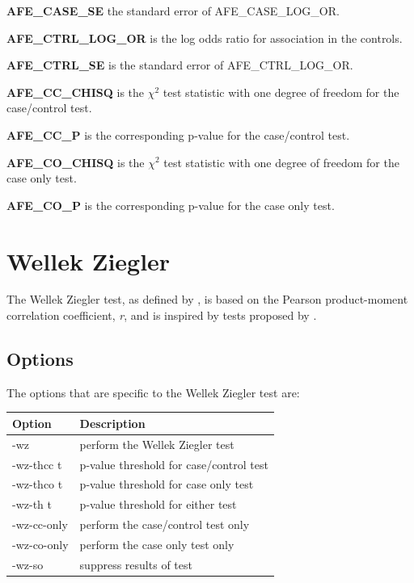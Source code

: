 \documentclass[a4paper,12pt]{article}
\begin{document}
{\bf AFE\_CASE\_SE} the standard error of AFE\_CASE\_LOG\_OR.

{\bf AFE\_CTRL\_LOG\_OR} is the log odds ratio for association in the controls. 

{\bf AFE\_CTRL\_SE} is the standard error of AFE\_CTRL\_LOG\_OR.

{\bf AFE\_CC\_CHISQ} is the $\chi^2$ test statistic with one degree of freedom for the case/control test. 

{\bf AFE\_CC\_P} is the corresponding p-value for the case/control test. 

{\bf AFE\_CO\_CHISQ} is the $\chi^2$ test statistic with one degree of freedom for the case only test. 

{\bf AFE\_CO\_P} is the corresponding p-value for the case only test. 




\section{Wellek Ziegler}
\label{wellek-ziegler}

The Wellek Ziegler test, as defined by \citet{ueki:etal:12}, is based on the Pearson product-moment correlation coefficient, {\it r}, and is inspired by tests proposed by \citet{wellek:ziegler:09}. 
\subsection{Options}
\label{wz-options}

The options that are specific to the Wellek Ziegler test are: 

{\begin{center}\begin{tabular}{ll}
Option  & Description\\
\hline
-wz  & perform the Wellek Ziegler test\\
-wz-thcc t  & p-value threshold for case/control test\\
-wz-thco t  & p-value threshold for case only test\\
-wz-th t  & p-value threshold for either test\\
-wz-cc-only  & perform the case/control test only\\
-wz-co-only  & perform the case only test only\\
-wz-so  & suppress results of test\\
\end{tabular}\end{center}}
\end{document}
